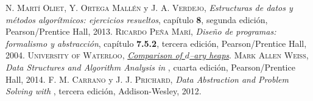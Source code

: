 \begin{thebibliography}{X}
		  \textsc{N. Martí Oliet, Y. Ortega Mallén} y \textsc{J. A. Verdejo},
		 	\textit{Estructuras de datos y métodos algorítmicos: ejercicios resueltos}, capítulo \textbf{8}, segunda edición, Pearson/Prentice Hall, 2013.
		  \textsc{Ricardo Peña Marí},
		 	\textit{Diseño de programas: formalismo y abstracción}, capítulo \textbf{7.5.2}, tercera edición, Pearson/Prentice Hall, 2004.
		 \textsc{University of Waterloo},
		 \href{https://ece.uwaterloo.ca/~dwharder/aads/Algorithms/d-ary_heaps/Comparisons/}{\textcolor{hyperlinkColour}{\textit{Comparison of $d$--ary heaps}}}.
		  \textsc{Mark Allen Weiss},
		 \textit{Data Structures and Algorithm Analysis in \CC}, cuarta edición, Pearson/Prentice Hall, 2014.
		   \textsc{F. M. Carrano} y \textsc{J. J. Prichard},
		 \textit{Data Abstraction and Problem Solving with \CC}, tercera edición, Addison-Wesley, 2012.
\end{thebibliography}

